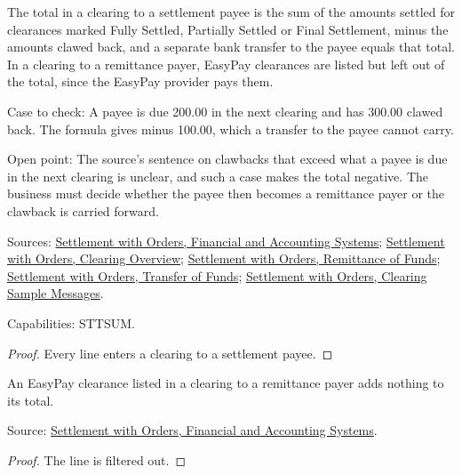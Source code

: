 \begin{theorem}
  \label{thm:accounting-clearing-total}
  The total in a clearing to a settlement payee is the sum of the amounts
  settled for clearances marked Fully Settled, Partially Settled or Final
  Settlement, minus the amounts clawed back, and a separate bank transfer to
  the payee equals that total. In a clearing to a remittance payer, EasyPay
  clearances are listed but left out of the total, since the EasyPay
  provider pays them.

  Case to check: A payee is due 200.00 in the next clearing and has 300.00
  clawed back. The formula gives minus 100.00, which a transfer to the payee
  cannot carry.

  Open point: The source's sentence on clawbacks that exceed what a payee is
  due in the next clearing is unclear, and such a case makes the total
  negative. The business must decide whether the payee then becomes a
  remittance payer or the clawback is carried forward.

  Sources: \href{https://standards.atlassian.net/wiki/spaces/SWO/pages/574554300}{Settlement with Orders, Financial and Accounting Systems};
  \href{https://standards.atlassian.net/wiki/spaces/SWO/pages/574587102}{Settlement with Orders, Clearing Overview};
  \href{https://standards.atlassian.net/wiki/spaces/SWO/pages/574718145}{Settlement with Orders, Remittance of Funds};
  \href{https://standards.atlassian.net/wiki/spaces/SWO/pages/574488849}{Settlement with Orders, Transfer of Funds};
  \href{https://standards.atlassian.net/wiki/spaces/SWO/pages/574881978}{Settlement with Orders, Clearing Sample Messages}.

  Capabilities: STTSUM.
\end{theorem}
\begin{proof}
  Every line enters a clearing to a settlement payee.
\end{proof}

\begin{theorem}
  \label{thm:accounting-payer-clearing-easypay}
  An EasyPay clearance listed in a clearing to a remittance payer adds
  nothing to its total.

  Source: \href{https://standards.atlassian.net/wiki/spaces/SWO/pages/574554300}{Settlement with Orders, Financial and Accounting Systems}.
\end{theorem}
\begin{proof}
  The line is filtered out.
\end{proof}

